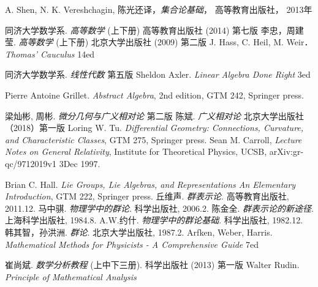 \begin{thebibliography}{99}
A. Shen, N. K. Vereshchagin, 陈光还译，\textsl{集合论基础}， 高等教育出版社， 2013年

同济大学数学系. \textsl{高等数学} (上下册) 高等教育出版社 (2014) 第七版
李忠，周建莹. \textsl{高等数学} (上下册) 北京大学出版社 (2009) 第二版
J. Hass, C. Heil, M. Weir．\textsl{Thomas' Cauculus} 14ed

同济大学数学系. \textsl{线性代数} 第五版
Sheldon Axler. \textsl{Linear Algebra Done Right} 3ed

Pierre Antoine Grillet. \textsl{Abstract Algebra}, 2nd edition, GTM 242, Springer press. 

梁灿彬, 周彬. \textsl{微分几何与广义相对论} 第二版
陈斌. \textsl{广义相对论} 北京大学出版社（2018）第一版
Loring W. Tu. \textsl{Differential Geometry: Connections, Curvature, and Characteristic Classes}, GTM 275, Springer press. 
Sean M. Carroll, \textsl{Lecture Notes on General Relativity}, Institute for Theoretical Physics, UCSB, arXiv:gr-qc/9712019v1 3Dec 1997. 

Brian C. Hall. \textsl{Lie Groups, Lie Algebras, and Representations An Elementary Introduction}, GTM 222, Springer press. 
丘维声. \textsl{群表示论}. 高等教育出版社, 2011.12.
马中骐. \textsl{物理学中的群论}. 科学出版社, 2006.2.
陈金全. \textsl{群表示论的新途径}. 上海科学出版社, 1984.8.
A.W.约什. \textsl{物理学中的群论基础}. 科学出版社, 1982.12.
韩其智，孙洪洲. \textsl{群论}. 北京大学出版社, 1987.2.
Arfken, Weber, Harris. \textsl{Mathematical Methods for Physicists - A Comprehensive Guide} 7ed

崔尚斌. \textsl{数学分析教程} (上中下三册). 科学出版社 (2013) 第一版
Walter Rudin. \textsl{Principle of Mathematical Analysis}


\end{thebibliography}
